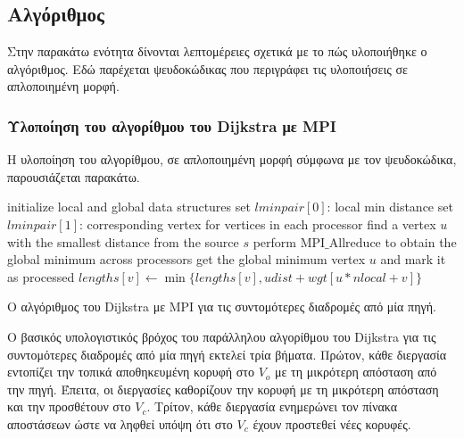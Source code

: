 \documentclass[12pt,a4paper]{article}
\begin{document}
\subsection{Αλγόριθμος}
Στην παρακάτω ενότητα δίνονται λεπτομέρειες σχετικά με το πώς υλοποιήθηκε ο αλγόριθμος. Εδώ παρέχεται ψευδοκώδικας που περιγράφει τις υλοποιήσεις σε απλοποιημένη μορφή.
\vspace{0.2cm}

\subsubsection{Υλοποίηση του αλγορίθμου του \foreignlanguage{english}{Dijkstra} με \foreignlanguage{english}{MPI}}
Η υλοποίηση του αλγορίθμου, σε απλοποιημένη μορφή σύμφωνα με τον ψευδοκώδικα, παρουσιάζεται παρακάτω.

\begin{algorithm}[H]
\begin{algorithmic}[1]
    \State initialize local and global data structures
        \State set $lminpair[0]$: local min distance
        \State set $lminpair[1]$: corresponding vertex
    \EndFor
        \State for vertices in each processor find a vertex $u$ with the smallest distance from the source $s$
        \State perform $\mathrm{MPI\_Allreduce}$ to obtain the global minimum across processors
        \State get the global minimum vertex $u$ and mark it as processed
         
            \State $lengths[v] \gets \min\{lengths[v], udist + wgt[u* nlocal + v]\}$
        \EndFor
    \EndWhile
\EndProcedure
\end{algorithmic}
\end{algorithm}


{\raggedright{} Ο αλγόριθμος του \foreignlanguage{english}{Dijkstra} με \foreignlanguage{english}{MPI} για τις συντομότερες διαδρομές από μία πηγή.\label{alg:dijkstra2}\par}
\vspace{0.3cm}

Ο βασικός υπολογιστικός βρόχος του παράλληλου αλγορίθμου του \foreignlanguage{english}{Dijkstra} για τις συντομότερες διαδρομές από μία πηγή εκτελεί τρία βήματα. Πρώτον, κάθε διεργασία εντοπίζει την τοπικά αποθηκευμένη κορυφή στο $V_o$ με τη μικρότερη απόσταση από την πηγή. Έπειτα, οι διεργασίες καθορίζουν την κορυφή με τη μικρότερη απόσταση και την προσθέτουν στο $V_c$. Τρίτον, κάθε διεργασία ενημερώνει τον πίνακα αποστάσεων ώστε να ληφθεί υπόψη ότι στο $V_c$ έχουν προστεθεί νέες κορυφές.
\end{document}
